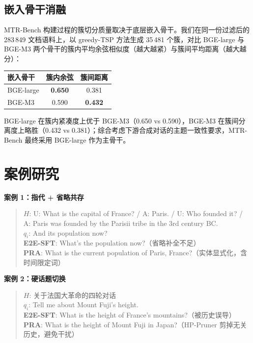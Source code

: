 \subsection{嵌入骨干消融}

MTR-Bench 构建过程的簇切分质量取决于底层嵌入骨干。我们在同一份过滤后的 283\,849 文档语料上，以 greedy-TSP 方法生成 35\,481 个簇，对比 BGE-large 与 BGE-M3 两个骨干的簇内平均余弦相似度（越大越紧）与簇间平均距离（越大越分）：

\begin{table}[h]
\centering
{}
\label{tab:mtr_embed}
\begin{tabular}{lcc}
\toprule
嵌入骨干 & 簇内余弦 & 簇间距离 \\
\midrule
BGE-large & \textbf{0.650} & 0.381 \\
BGE-M3    & 0.590 & \textbf{0.432} \\
\bottomrule
\end{tabular}
\end{table}

BGE-large 在簇内紧凑度上优于 BGE-M3（0.650 vs 0.590），BGE-M3 在簇间分离度上略胜（0.432 vs 0.381）；综合考虑下游合成对话的主题一致性要求，MTR-Bench 最终采用 BGE-large 作为主骨干。

\section{案例研究}
\label{sec:exp_case}

\textbf{案例 1：指代 + 省略共存}

\begin{quote}
\textbf{$H$}: U: What is the capital of France? / A: Paris. / U: Who founded it? / A: Paris was founded by the Parisii tribe in the 3rd century BC. \\
\textbf{$q_i$}: And its population now?\\
\textbf{E2E-SFT}: What's the population now?（省略补全不足）\\
\textbf{PRA}: What is the current population of Paris, France?（实体显式化，含时间限定词）
\end{quote}

\textbf{案例 2：硬话题切换}

\begin{quote}
\textbf{$H$}: 关于法国大革命的四轮对话 \\
\textbf{$q_i$}: Tell me about Mount Fuji's height.\\
\textbf{E2E-SFT}: What is the height of France's mountains?（被历史误导）\\
\textbf{PRA}: What is the height of Mount Fuji in Japan?（HP-Pruner 剪掉无关历史，避免干扰）
\end{quote}

